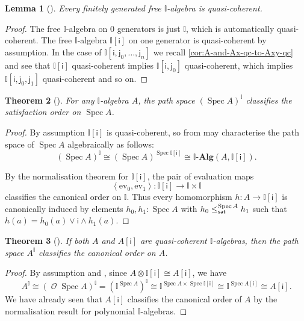 \documentclass[a4paper,12pt]{amsart}
\newtheorem{theorem}{Theorem}[section]
\newtheorem{lemma}[theorem]{Lemma}
\theoremstyle{definition}
\newcommand{\mc}[1]{\mathcal{#1}}
\newcommand{\mb}[1]{\mathbf{#1}}
\newcommand{\mbb}[1]{\mathbb{#1}}
\newcommand{\I}{\mbb I}
\newcommand{\ms}[1]{\mathsf{#1}}
\newcommand{\alg}{\text{-}\mb{Alg}}
\newcommand{\pair}[1]{\left\langle#1\right\rangle}
\newcommand{\ev}{\mathrm{ev}}
\newcommand{\spec}{\operatorname{Spec}}
\newcommand{\opens}{\operatorname{\mc{O}}} %
\begin{document}
\begin{lemma}[\AxiomSQCP]\label{lem:fg-qc}
  Every finitely generated free $\I$-algebra is quasi-coherent.
\end{lemma}

\begin{proof}
  The free $\I$-algebra on $0$ generators is just $\I$, which is automatically quasi-coherent. The free $\I$-algebra $\I[\ms{i}]$ on one generator is quasi-coherent by assumption. In the case of $\I[\ms{i},\ms{j}_0,\ldots,\ms{j}_n]$ we recall \cref{cor:A-and-Ax-qc-to-Axy-qc} and see that $\I[\ms{i}]$ quasi-coherent implies $\I[\ms{i},\ms{j}_0]$ quasi-coherent, which implies $\I[\ms{i},\ms{j}_0,\ms{j}_1]$ quasi-coherent and so on.
\end{proof}


\begin{theorem}[\AxiomSQCP]\label{thm:phoa-spectrum}
  For any $\I$-algebra $A$, the path space ${(\spec A)}^\I$ classifies the satisfaction order on $\spec A$.
\end{theorem}
\begin{proof}
  By assumption $\I[\ms{i}]$ is quasi-coherent, so from  may characterise the path space of $\spec{A}$ algebraically as follows:
  \[ (\spec A)^\I \cong (\spec{A})^{\spec{\I[\ms{i}]}}\cong \I\alg(A,\I[\ms{i}])\text{.} \]
  
  By the normalisation theorem for $\I[\ms{i}]$, the pair of evaluation maps
  \[ \pair{\ev_0,\ev_1} \colon \I[\ms{i}] \to \I \times \I \]
  classifies the canonical order on $\I$.
  Thus every homomorphism $h\colon A\to \I[\ms{i}]$ is canonically induced by elements $h_0,h_1:\spec{A}$ with $h_0\satle[\spec{A}] h_1$ such that $h(a) = h_0(a) \vee \ms{i} \wedge h_1(a)$.
\end{proof}


\begin{theorem}[\AxiomSQCP]\label{thm:algebraphoa}
  If both $A$ and $A[\ms{i}]$ are quasi-coherent $\I$-algebras, then the path space $A^\I$ classifies the canonical order on $A$.
\end{theorem}
\begin{proof}
  By assumption and , since $A \otimes \I[\ms{i}] \cong A[\ms{i}]$, we have
  \[ A^\I \cong (\opens{\spec A})^\I = (\I^{\spec A})^\I \cong \I^{\spec A \times \spec\I[\ms{i}]} \cong \I^{\spec A[\ms{i}]} \cong A[\ms{i}]\text{.} \]
  We have already seen that $A[\ms{i}]$ classifies the canonical order of $A$ by the normalisation result for polynomial $\I$-algebras.
\end{proof}
\end{document}
